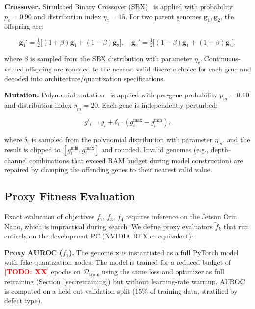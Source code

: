\documentclass[journal]{IEEEtran}
\newcommand{\TODO}[1]{\textcolor{red}{\textbf{[TODO: #1]}}}
\begin{document}
\textbf{Crossover.}
Simulated Binary Crossover (SBX)~\cite{deb2001multi} is applied with
probability $p_c = 0.90$ and distribution index $\eta_c = 15$.
For two parent genomes $\bm{g}_1, \bm{g}_2$, the offspring are:

\begin{equation}
\bm{g}_1' = \tfrac{1}{2}\bigl[(1+\beta)\bm{g}_1 + (1-\beta)\bm{g}_2\bigr], \quad
\bm{g}_2' = \tfrac{1}{2}\bigl[(1-\beta)\bm{g}_1 + (1+\beta)\bm{g}_2\bigr],
\label{eq:sbx}
\end{equation}

where $\beta$ is sampled from the SBX distribution with parameter $\eta_c$.
Continuous-valued offspring are rounded to the nearest valid discrete choice
for each gene and decoded into architecture/quantization specifications.

\textbf{Mutation.}
Polynomial mutation~\cite{deb2001multi} is applied with per-gene probability
$p_m = 0.10$ and distribution index $\eta_m = 20$.
Each gene is independently perturbed:

\begin{equation}
g'_i = g_i + \delta_i \cdot (g_i^{\max} - g_i^{\min}),
\label{eq:poly_mut}
\end{equation}

where $\delta_i$ is sampled from the polynomial distribution with parameter
$\eta_m$, and the result is clipped to $[g_i^{\min}, g_i^{\max}]$ and rounded.
Invalid genomes (e.g., depth--channel combinations that exceed RAM budget
during model construction) are repaired by clamping the offending genes to
their nearest valid value.

\subsection{Proxy Fitness Evaluation}
\label{sec:proxy}

Exact evaluation of objectives $f_2$, $f_3$, $f_4$ requires inference on the
Jetson Orin Nano, which is impractical during search.
We define proxy evaluators $\tilde{f}_k$ that run entirely on the development
PC (NVIDIA RTX or equivalent):

\textbf{Proxy AUROC ($\tilde{f}_1$).}
The genome $\bm{x}$ is instantiated as a full PyTorch model with fake-quantization
nodes.
The model is trained for a reduced budget of \TODO{XX} epochs on
$\mathcal{D}_{\mathrm{train}}$ using the same loss and optimizer as full
retraining (Section~\ref{sec:retraining}) but without learning-rate warmup.
AUROC is computed on a held-out validation split (15\% of training data,
stratified by defect type).
\end{document}
